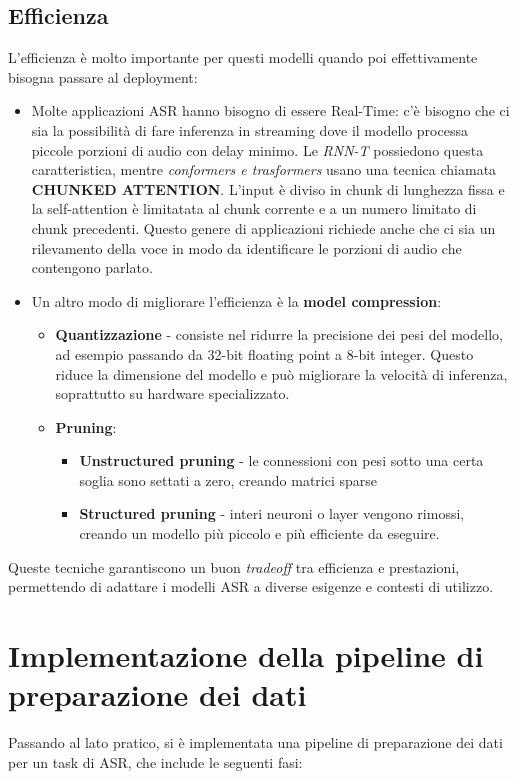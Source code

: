 \documentclass[12pt, a4paper]{article}
\begin{document}
\subsection{Efficienza}
L'efficienza è molto importante per questi modelli quando poi effettivamente bisogna passare al deployment:
\begin{itemize}
  \item Molte applicazioni ASR hanno bisogno di essere Real-Time: c'è bisogno che ci sia la possibilità di fare inferenza in streaming dove il modello processa piccole porzioni di audio con delay minimo. Le \emph{RNN-T} possiedono questa caratteristica, mentre \emph{conformers e trasformers} usano una tecnica chiamata \textbf{CHUNKED ATTENTION}. L'input è diviso in chunk di lunghezza fissa e la self-attention è limitatata al chunk corrente e a un numero limitato di chunk precedenti.
    Questo genere di applicazioni richiede anche che ci sia un rilevamento della voce in modo da identificare le porzioni di audio che contengono parlato.
    \\
  \item Un altro modo di migliorare l'efficienza è la \textbf{model compression}:
    \begin{itemize}
      \item \textbf{Quantizzazione} - consiste nel ridurre la precisione dei pesi del modello, ad esempio passando da 32-bit floating point a 8-bit integer. Questo riduce la dimensione del modello e può migliorare la velocità di inferenza, soprattutto su hardware specializzato.
      \item \textbf{Pruning}:
        \begin{itemize}
          \item \textbf{Unstructured pruning} - le connessioni con pesi sotto una certa soglia sono settati a zero, creando matrici sparse
          \item \textbf{Structured pruning} - interi neuroni o layer vengono rimossi, creando un modello più piccolo e più efficiente da eseguire.
        \end{itemize}
    \end{itemize}
\end{itemize}
Queste tecniche garantiscono un buon \emph{tradeoff} tra efficienza e prestazioni, permettendo di adattare i modelli ASR a diverse esigenze e contesti di utilizzo.

\section{Implementazione della pipeline di preparazione dei dati}
Passando al lato pratico, si è implementata una pipeline di preparazione dei dati per un task di ASR, che include le seguenti fasi:
\end{document}

